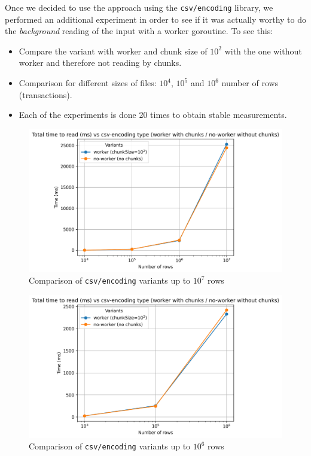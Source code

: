 Once we decided to use the approach using the \texttt{csv/encoding} library, we performed an additional experiment in order to see if it was actually worthy to do the \emph{background} reading of the input with a worker goroutine. To see this:

\begin{itemize}
  \item Compare the variant with worker and chunk size of $10^2$ with the one without worker and therefore not reading by chunks.
  \item Comparison for different sizes of files: $10^4$, $10^5$ and $10^6$ number of rows (transactions).
  \item Each of the experiments is done 20 times to obtain stable measurements.
\end{itemize}

\begin{figure}[H]
  \centering
  \includegraphics[scale = 0.7]{images/4-Experiments/read-input-csv-encoding-all.png}
  \caption{Comparison of \texttt{csv/encoding} variants up to $10^7$ rows}
\end{figure}

\begin{figure}[H]
  \centering
  \includegraphics[scale = 0.7]{images/4-Experiments/read-input-csv-encoding.png}
  \caption{Comparison of \texttt{csv/encoding} variants up to $10^6$ rows}
\end{figure}

